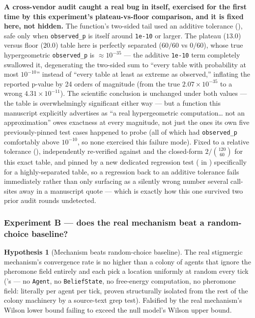 \documentclass[
  english,
]{article}
\newcounter{none} %
\theoremstyle{definition}
\newtheorem{hypothesis}[theorem]{Hypothesis}
\begin{document}
\textbf{A cross-vendor audit caught a real bug in
 itself, exercised for the first
time by this experiment's plateau-vs-floor comparison, and it is fixed
here, not hidden.} The function's two-sided tail used an additive
tolerance (), safe only when
\texttt{observed\_p} is itself around \texttt{1e-10} or larger. The
plateau (\(13.0\)) versus floor (\(20.0\)) table here is perfectly
separated (\(60/60\) vs \(0/60\)), whose true hypergeometric
\texttt{observed\_p} is \(\approx10^{-35}\) --- the additive
\texttt{1e-10} term completely swallowed it, degenerating the two-sided
sum to ``every table with probability at most \(10^{-10}\)'' instead of
``every table at least as extreme as observed,'' inflating the reported
p-value by 24 orders of magnitude (from the true \(2.07\times10^{-35}\)
to a wrong \(4.31\times10^{-11}\)). The scientific conclusion is
unchanged under both values --- the table is overwhelmingly significant
either way --- but a function this manuscript explicitly advertises as
``a real hypergeometric computation\ldots{} not an approximation'' owes
exactness at every magnitude, not just the ones its own five
previously-pinned test cases happened to probe (all of which had
\texttt{observed\_p} comfortably above \(10^{-10}\), so none exercised
this failure mode). Fixed to a relative tolerance
(), independently re-verified
against  and the closed-form
\(2/\binom{120}{60}\) for this exact table, and pinned by a new
dedicated regression test
(
in ) specifically for
a highly-separated table, so a regression back to an additive tolerance
fails immediately rather than only surfacing as a silently wrong number
several call-sites away in a manuscript quote --- which is exactly how
this one survived two prior audit rounds undetected.

\subsubsection{Experiment B --- does the real mechanism beat a
random-choice
baseline?}\label{experiment-b-does-the-real-mechanism-beat-a-random-choice-baseline}

\begin{hypothesis}[Mechanism beats random-choice baseline]
The real stigmergic mechanism's convergence rate is no higher than a colony of agents that ignore the
pheromone field entirely and each pick a location uniformly at random every tick
('s  — no \texttt{Agent}, no
\texttt{BeliefState}, no free-energy computation, no pheromone field: literally
 per agent per tick, proven structurally isolated from
the rest of the colony machinery by a source-text grep test). Falsified by the real mechanism's
Wilson lower bound failing to exceed the null model's Wilson upper bound.
\end{hypothesis}
\end{document}
